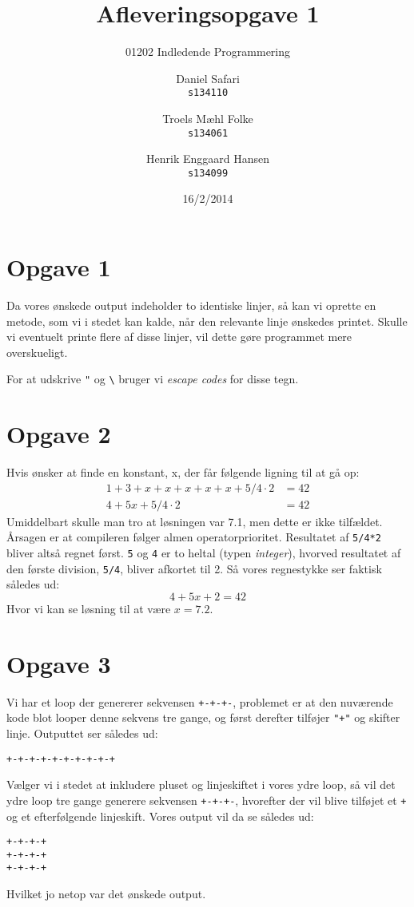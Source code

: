 \documentclass{scrartcl}
\newcommand\code[1]{\texttt{#1}}
\begin{document}

\title{Afleveringsopgave 1}
\subtitle{01202 Indledende Programmering}
\author{
  Daniel Safari\\
  \texttt{s134110}
  \and
  Troels Mæhl Folke\\
  \texttt{s134061}
   \and
  Henrik Enggaard Hansen\\
  \texttt{s134099}
}
\date{16/2/2014}
\maketitle

\section*{Opgave 1}
Da vores ønskede output indeholder to identiske linjer, så kan vi oprette en metode, som vi i stedet kan kalde, når den relevante linje ønskedes printet. Skulle vi eventuelt printe flere af disse linjer, vil dette gøre programmet mere overskueligt.

For at udskrive \code{"} og \code{\textbackslash} bruger vi \emph{escape codes} for disse tegn.

\section*{Opgave 2}
Hvis ønsker at finde en konstant, x, der får følgende ligning til at gå op: 
\begin{align*}
1+3+x+x+x+x+x+5/4 \cdot 2 & = 42 \\
         4+5x+5/4 \cdot 2 & = 42
\end{align*}
Umiddelbart skulle man tro at løsningen var 7.1, men dette er ikke tilfældet. Årsagen er at compileren følger almen operatorprioritet. Resultatet af \code{5/4*2} bliver altså regnet først. \code{5} og \code{4} er to heltal (typen \emph{integer}), hvorved resultatet af den første division, \code{5/4}, bliver afkortet til 2. Så vores regnestykke ser faktisk således ud:
$$ 4+5x+2 = 42 $$
Hvor vi kan se løsning til at være $x=7.2$.


\section*{Opgave 3}
Vi har et loop der genererer sekvensen \code{+-+-+-}, problemet er at den nuværende kode blot looper denne sekvens tre gange, og først derefter tilføjer \code{"+"} og skifter linje. Outputtet ser således ud:
\begin{Verbatim}
+-+-+-+-+-+-+-+-+-+
\end{Verbatim}
Vælger vi i stedet at inkludere pluset og linjeskiftet i vores ydre loop, så vil det ydre loop tre gange generere sekvensen \code{+-+-+-}, hvorefter der vil blive tilføjet et \code{+} og et efterfølgende linjeskift.
Vores output vil da se således ud:
\begin{Verbatim}
+-+-+-+
+-+-+-+
+-+-+-+
\end{Verbatim}
Hvilket jo netop var det ønskede output.
\end{document}
